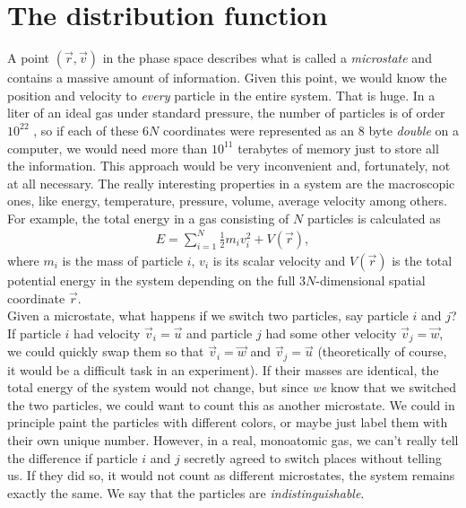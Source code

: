 \section{The distribution function}
\label{sec:kinetic_theory_distribution_function}
A point $(\vec r, \vec v)$ in the phase space describes what is called a \textit{microstate} and contains a massive amount of information. Given this point, we would know the position and velocity to \textit{every} particle in the entire system. That is huge. In a liter of an ideal gas under standard pressure, the number of particles is of order $10^{22}$ \cite{garcia2000numerical}, so if each of these $6N$ coordinates were represented as an 8 byte \textit{double} on a computer, we would need more than $10^{11}$ terabytes of memory just to store all the information. This approach would be very inconvenient and, fortunately, not at all necessary. The really interesting properties in a system are the macroscopic ones, like energy, temperature, pressure, volume, average velocity among others. For example, the total energy in a gas consisting of $N$ particles is calculated as
\begin{align*}
	E = \sum_{i=1}^N \frac{1}{2} m_i v_i^2 + V(\vec r),
\end{align*}
where $m_i$ is the mass of particle $i$, $v_i$ is its scalar velocity and $V(\vec r)$ is the total potential energy in the system depending on the full $3N$-dimensional spatial coordinate $\vec r$.\\
Given a microstate, what happens if we switch two particles, say particle $i$ and $j$? If particle $i$ had velocity $\vec v_i = \vec u$ and particle $j$ had some other velocity $\vec v_j = \vec w$, we could quickly swap them so that $\vec v_i = \vec w$ and $\vec v_j = \vec u$ (theoretically of course, it would be a difficult task in an experiment). If their masses are identical, the total energy of the system would not change, but since \textit{we} know that we switched the two particles, we could want to count this as another microstate. We could in principle paint the particles with different colors, or maybe just label them with their own unique number. However, in a real, monoatomic gas, we can't really tell the difference if particle $i$ and $j$ secretly agreed to switch places without telling us. If they did so, it would not count as different microstates, the system remains exactly the same. We say that the particles are \textit{indistinguishable}.\\
